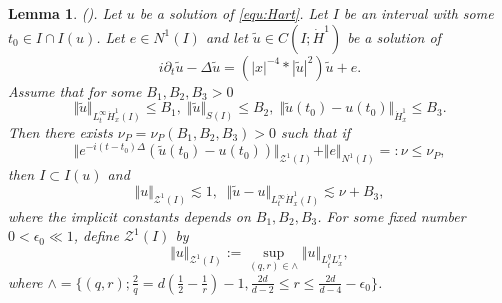 \documentclass[reqno, 11pt]{amsart}
\numberwithin{equation}{section}
\theoremstyle{plain}
\newtheorem{lemma}[theorem]{Lemma}
\theoremstyle{definition}
\numberwithin{equation}{section}
\numberwithin{theorem}{section}
\numberwithin{equation}{section}
\numberwithin{equation}{section}
\numberwithin{theorem}{section}
\begin{document}
	
	
	\begin{lemma}(\cite{MXZ:crit Hart:f rad})\label{lem:pert}. Let $u$ be a solution of \eqref{equ:Hart}. Let $I$ be an interval with some $t_0\in I\cap I(u)$. Let $e\in N^1(I)$ and let $\widetilde{u}\in C(I;\dot H^1)$ be a solution of 
		\begin{equation*}
		i\partial_t \widetilde{u} -\Delta \widetilde{u}= \left( |x|^{-4}*|\widetilde{u}|^2\right)\widetilde{u} +e.
		\end{equation*}	
		Assume that for some $B_1,B_2,B_3>0$
		\begin{equation*}
		\Vert \widetilde{u} \Vert_{L_{t}^{\infty} \dot H_x^1(I) }\leq B_1,\; \Vert \widetilde{u} \Vert_{S(I)}\leq B_2,\; \Vert \widetilde{u}(t_0)-u(t_0) \Vert_{\dot H_x^1}\leq B_3 .
		\end{equation*}
		Then there exists $\nu_P=\nu_P(B_1,B_2,B_3)>0$ such that if
		\begin{equation*}
		\Vert e^{-i(t-t_0)\Delta}\left( \widetilde{u}(t_0)-u(t_0) \right) \Vert_{\mathcal{Z}^1(I)} + \Vert e \Vert_{N^1(I)}=:\nu \leq \nu_P ,
		\end{equation*}
		then $I\subset I(u)$ and 
		\begin{equation*}
		\Vert u \Vert_{\mathcal{Z}^1(I)}\lesssim 1,\;\; \Vert \widetilde{u}-u \Vert_{L_{t}^{\infty} \dot H_x^1(I) } \lesssim \nu+B_3,
		\end{equation*}
		where the implicit constants depends on $B_1,B_2,B_3$. For some fixed number $0<\epsilon_0 \ll 1$, define $\mathcal{Z}^1(I)$ by 
		\begin{equation*}
		\Vert u \Vert_{\mathcal{Z}^1(I)}:=\sup_{(q,r)\in \wedge}\Vert u \Vert_{L_{t}^{q}L_{x}^{r}},
		\end{equation*}
		where $\wedge=\{(q,r);\frac{2}{q}=d(\frac{1}{2}-\frac{1}{r})-1,\frac{2d}{d-2}\leq r\leq \frac{2d}{d-4}-\epsilon_0 \}$.
	\end{lemma}
	
\end{document}
